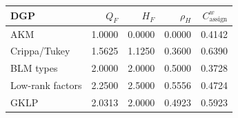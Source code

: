 \begin{tabular}{lrrrr}
\toprule
DGP & $Q_F$ & $H_F$ & $\rho_H$ & $C^w_{\mathrm{assign}}$ \\
\midrule
AKM & 1.0000 & 0.0000 & 0.0000 & 0.4142 \\
Crippa/Tukey & 1.5625 & 1.1250 & 0.3600 & 0.6390 \\
BLM types & 2.0000 & 2.0000 & 0.5000 & 0.3728 \\
Low-rank factors & 2.2500 & 2.5000 & 0.5556 & 0.4724 \\
GKLP & 2.0313 & 2.0000 & 0.4923 & 0.5923 \\
\bottomrule
\end{tabular}


